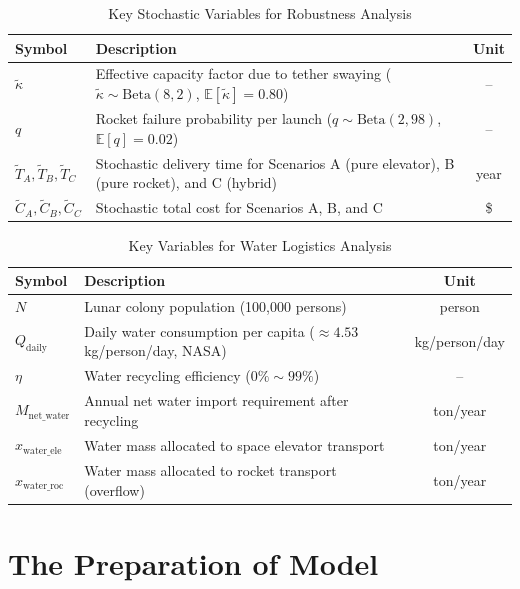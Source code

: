\documentclass{mcmthesis}
\begin{document}
	\begin{table}[htbp]
		\centering
		\caption{Key Stochastic Variables for Robustness Analysis}
		\label{tab:stochastic}
		\begin{tabular}{l p{9cm} c} 
			\toprule
			\textbf{Symbol} & \textbf{Description} & \textbf{Unit} \\
			\midrule
			$\tilde{\kappa}$            & Effective capacity factor due to tether swaying ($\tilde{\kappa} \sim \mathrm{Beta}(8,2)$, $\mathbb{E}[\tilde{\kappa}] = 0.80$) & -- \\
			$q$                         & Rocket failure probability per launch ($q \sim \mathrm{Beta}(2,98)$, $\mathbb{E}[q] = 0.02$) & -- \\
			$\tilde{T}_A, \tilde{T}_B, \tilde{T}_C$ & Stochastic delivery time for Scenarios A (pure elevator), B (pure rocket), and C (hybrid) & year \\
			$\tilde{C}_A, \tilde{C}_B, \tilde{C}_C$ & Stochastic total cost for Scenarios A, B, and C & \$ \\
			\bottomrule
		\end{tabular}
	\end{table}
	\begin{table}[htbp]
		\centering
		\caption{Key Variables for Water Logistics Analysis}
		\label{tab:water}
		\begin{tabular}{l p{9cm} c} 
			\toprule
			\textbf{Symbol} & \textbf{Description} & \textbf{Unit} \\
			\midrule
			$N$                     & Lunar colony population (100,000 persons) & person \\
			$Q_{\text{daily}}$      & Daily water consumption per capita ($\approx 4.53$ kg/person/day, NASA) & kg/person/day \\
			$\eta$                  & Water recycling efficiency ($0\% \sim 99\%$) & -- \\
			$M_{\text{net\_water}}$ & Annual net water import requirement after recycling & ton/year \\
			$x_{\text{water\_ele}}$ & Water mass allocated to space elevator transport & ton/year \\
			$x_{\text{water\_roc}}$ & Water mass allocated to rocket transport (overflow) & ton/year \\
			\bottomrule
		\end{tabular}
	\end{table}
	\section{The Preparation of Model}
\end{document}
